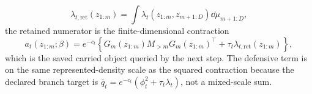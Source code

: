 \begin{equation}
  \lambda_{t,\mathrm{ret}}(z_{1:m})
  =\int\lambda_t(z_{1:m},z_{m+1:D})\dd\mu_{m+1:D},
  \label{eq:bf-hd-squared-tt-defensive-retained}
\end{equation}
the retained numerator is the finite-dimensional contraction
\begin{equation}
  a_t(z_{1:m};\beta)
  =
  e^{-c_t}
  \left\{
    G_m(z_{1:m})M_{>m}G_m(z_{1:m})^\top
    +\tau_t\lambda_{t,\mathrm{ret}}(z_{1:m})
  \right\},
  \label{eq:bf-hd-squared-tt-retained-numerator-contraction}
\end{equation}
which is the saved carried object queried by the next step.  The defensive term
is on the same represented-density scale as the squared contraction because the
declared branch target is
\(\overline q_t=e^{-c_t}(\phi_t^2+\tau_t\lambda_t)\),
not a mixed-scale sum.

